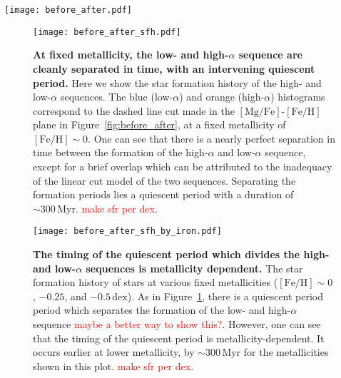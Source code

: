 \documentclass[linenumbers, twocolumn]{aastex631}
\newcommand{\Gyr}{\ensuremath{\textrm{Gyr}}}
\newcommand{\Myr}{\ensuremath{\textrm{Myr}}}
\newcommand{\FeH}{\ensuremath{[\textrm{Fe}/\textrm{H}]}}
\newcommand{\MgFe}{\ensuremath{[\textrm{Mg}/\textrm{Fe}]}}
\newcommand{\tform}{\ensuremath{t_{\textrm{form}}}}
\newcommand{\red}[1]{\textcolor{red}{#1}}
\begin{document}
\begin{figure*}
  \centering
  \texttt{[image: before\_after.pdf]}
  \caption{\textbf{The high-$\alpha$ sequence forms before the merger, the low-$\alpha$ sequence forms after the merger.} This plot shows the sequence of events leading to the build-up of the low- and high-$\alpha$ sequences for our fiducial bimodal simulation. We have separated the high- and low-$\alpha$ sequences by a dashed line at $-0.1\FeH + 0.31$, which was chosen by eye to lie in the trough. The left panel shows all star particles in our solar neighborhood cut. The middle left panel shows the star particles that form before the merger ($\tform < 1.5\,\Gyr$), which form a weak sequence of star particles at the lowest \FeH and highest \MgFe. The middle right panel shows the star particles that form during the merger ($1.5\,\Gyr < \tform < 2.5\,\Gyr$). These star particless form the portion of the high-$\alpha$ sequence closest to the trough, and the density of star particless is higher than those that form before. The middle right panel shows the star particles which form after the merger ($\tform > 2.5\,\Gyr$). These star particles form almost entirely below the trough.}
  \label{fig:before_after}
\end{figure*}

\begin{figure}
  \centering
  \texttt{[image: before\_after\_sfh.pdf]}
  \caption{\textbf{At fixed metallicity, the low- and high-$\alpha$ sequence are cleanly separated in time, with an intervening quiescent period.} Here we show the star formation history of the high- and low-$\alpha$ sequences. The blue (low-$\alpha$) and orange (high-$\alpha$) histograms correspond to the dashed line cut made in the \MgFe-\FeH plane in Figure~\ref{fig:before_after}, at a fixed metallicity of $\FeH\sim0$. One can see that there is a nearly perfect separation in time between the formation of the high-$\alpha$ and low-$\alpha$ sequence, except for a brief overlap which can be attributed to the inadequacy of the linear cut model of the two sequences. Separating the formation periods lies a quiescent period with a duration of $\sim300\,\Myr$. \red{make sfr per dex}.}
  \label{fig:before_after_sfh}
\end{figure}

\begin{figure}
  \centering
  \texttt{[image: before\_after\_sfh\_by\_iron.pdf]}
  \caption{\textbf{The timing of the quiescent period which divides the high- and low-$\alpha$ sequences is metallicity dependent.} The star formation history of stars at various fixed metallicities ($\FeH\sim0$, $-0.25$, and $-0.5\,\textrm{dex}$). As in Figure~\ref{fig:before_after_sfh}, there is a quiescent period period which separates the formation of the low- and high-$\alpha$ sequence \red{maybe a better way to show this?}. However, one can see that the timing of the quiescent period is metallicity-dependent. It occurs earlier at lower metallicity, by $\sim300\,\Myr$ for the metallicities shown in this plot. \red{make sfr per dex}.}
  \label{fig:before_after_sfh_by_iron}
\end{figure}
\end{document}
